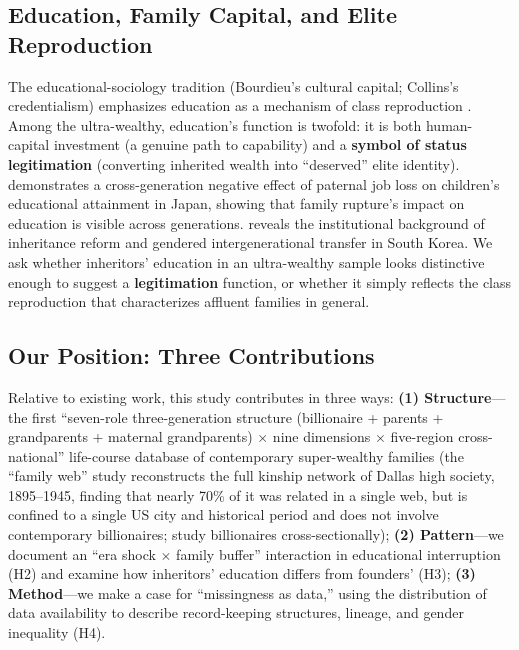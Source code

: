 \documentclass[11pt,a4paper]{article}
\begin{document}
\subsection{Education, Family Capital, and Elite Reproduction}

The educational-sociology tradition (Bourdieu's cultural capital; Collins's credentialism) emphasizes education as a mechanism of class reproduction \citep{bourdieu1986,collins1979}. Among the ultra-wealthy, education's function is twofold: it is both human-capital investment (a genuine path to capability) and a \textbf{symbol of status legitimation} (converting inherited wealth into ``deserved'' elite identity). \citet{sato2024} demonstrates a cross-generation negative effect of paternal job loss on children's educational attainment in Japan, showing that family rupture's impact on education is visible across generations. \citet{kim2025} reveals the institutional background of inheritance reform and gendered intergenerational transfer in South Korea. We ask whether inheritors' education in an ultra-wealthy sample looks distinctive enough to suggest a \textbf{legitimation} function, or whether it simply reflects the class reproduction that characterizes affluent families in general.

\subsection{Our Position: Three Contributions}

Relative to existing work, this study contributes in three ways: \textbf{(1) Structure}---the first ``seven-role three-generation structure (billionaire + parents + grandparents + maternal grandparents) $\times$ nine dimensions $\times$ five-region cross-national'' life-course database of contemporary super-wealthy families (the ``family web'' study \citep{familyweb2023} reconstructs the full kinship network of Dallas high society, 1895--1945, finding that nearly 70\% of it was related in a single web, but is confined to a single US city and historical period and does not involve contemporary billionaires; \citet{lillie2025} study billionaires cross-sectionally); \textbf{(2) Pattern}---we document an ``era shock $\times$ family buffer'' interaction in educational interruption (H2) and examine how inheritors' education differs from founders' (H3); \textbf{(3) Method}---we make a case for ``missingness as data,'' using the distribution of data availability to describe record-keeping structures, lineage, and gender inequality (H4).
\end{document}
